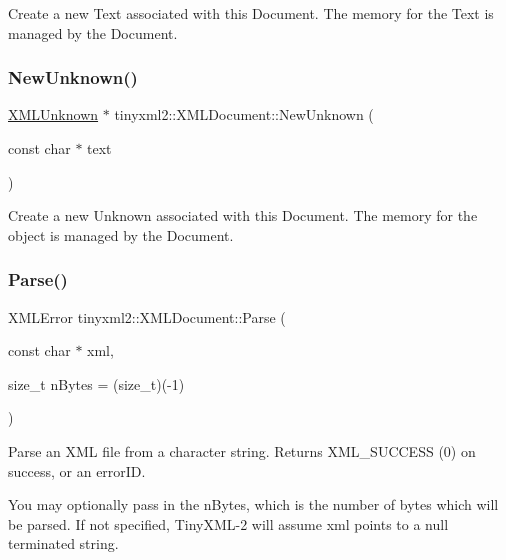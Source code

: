 Create a new Text associated with this Document. The memory for the Text is managed by the Document. \mbox{\label{classtinyxml2_1_1_x_m_l_document_a4954f502c5fd7f49de54c3c0c99bb73d}} 
\subsubsection{\texorpdfstring{New\+Unknown()}{NewUnknown()}}
{\footnotesize\ttfamily \mbox{\hyperlink{classtinyxml2_1_1_x_m_l_unknown}{X\+M\+L\+Unknown}} $\ast$ tinyxml2\+::\+X\+M\+L\+Document\+::\+New\+Unknown (\begin{DoxyParamCaption}\item[{const char $\ast$}]{text }\end{DoxyParamCaption})}

Create a new Unknown associated with this Document. The memory for the object is managed by the Document. \mbox{\label{classtinyxml2_1_1_x_m_l_document_a1819bd34f540a7304c105a6232d25a1f}} 
\subsubsection{\texorpdfstring{Parse()}{Parse()}}
{\footnotesize\ttfamily X\+M\+L\+Error tinyxml2\+::\+X\+M\+L\+Document\+::\+Parse (\begin{DoxyParamCaption}\item[{const char $\ast$}]{xml,  }\item[{size\+\_\+t}]{n\+Bytes = {\ttfamily (size\+\_\+t)(-\/1)} }\end{DoxyParamCaption})}

Parse an X\+ML file from a character string. Returns X\+M\+L\+\_\+\+S\+U\+C\+C\+E\+SS (0) on success, or an error\+ID.

You may optionally pass in the \textquotesingle{}n\+Bytes\textquotesingle{}, which is the number of bytes which will be parsed. If not specified, Tiny\+X\+M\+L-\/2 will assume \textquotesingle{}xml\textquotesingle{} points to a null terminated string. \mbox{\label{classtinyxml2_1_1_x_m_l_document_a867cf5fa3e3ff6ae4847a8b7ee8ec083}} 
